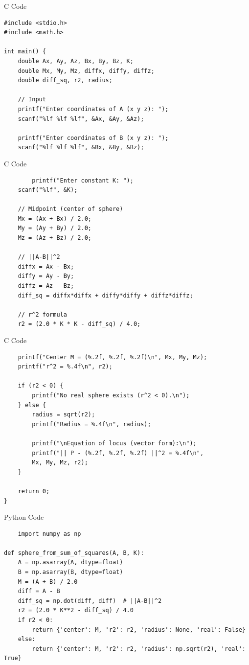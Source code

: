 \documentclass{beamer}
\begin{document}
\begin{frame}[fragile]{C Code}
    \begin{verbatim}
#include <stdio.h>
#include <math.h>

int main() {
    double Ax, Ay, Az, Bx, By, Bz, K;
    double Mx, My, Mz, diffx, diffy, diffz;
    double diff_sq, r2, radius;

    // Input
    printf("Enter coordinates of A (x y z): ");
    scanf("%lf %lf %lf", &Ax, &Ay, &Az);

    printf("Enter coordinates of B (x y z): ");
    scanf("%lf %lf %lf", &Bx, &By, &Bz);

    \end{verbatim}
\end{frame}
\begin{frame}[fragile]{C Code}
    \begin{verbatim}
        printf("Enter constant K: ");
    scanf("%lf", &K);

    // Midpoint (center of sphere)
    Mx = (Ax + Bx) / 2.0;
    My = (Ay + By) / 2.0;
    Mz = (Az + Bz) / 2.0;

    // ||A-B||^2
    diffx = Ax - Bx;
    diffy = Ay - By;
    diffz = Az - Bz;
    diff_sq = diffx*diffx + diffy*diffy + diffz*diffz;

    // r^2 formula
    r2 = (2.0 * K * K - diff_sq) / 4.0;
    \end{verbatim}
\end{frame}

\begin{frame}[fragile]{C Code}
    \begin{verbatim}
    printf("Center M = (%.2f, %.2f, %.2f)\n", Mx, My, Mz);
    printf("r^2 = %.4f\n", r2);

    if (r2 < 0) {
        printf("No real sphere exists (r^2 < 0).\n");
    } else {
        radius = sqrt(r2);
        printf("Radius = %.4f\n", radius);

        printf("\nEquation of locus (vector form):\n");
        printf("|| P - (%.2f, %.2f, %.2f) ||^2 = %.4f\n",
        Mx, My, Mz, r2);
    }

    return 0;
}
    \end{verbatim}
\end{frame}
\begin{frame}[fragile]{Python Code}
    \begin{verbatim}
    import numpy as np

def sphere_from_sum_of_squares(A, B, K):
    A = np.asarray(A, dtype=float)
    B = np.asarray(B, dtype=float)
    M = (A + B) / 2.0
    diff = A - B
    diff_sq = np.dot(diff, diff)  # ||A-B||^2
    r2 = (2.0 * K**2 - diff_sq) / 4.0
    if r2 < 0:
        return {'center': M, 'r2': r2, 'radius': None, 'real': False}
    else:
        return {'center': M, 'r2': r2, 'radius': np.sqrt(r2), 'real': True}
    \end{verbatim}
\end{frame}
\end{document}
